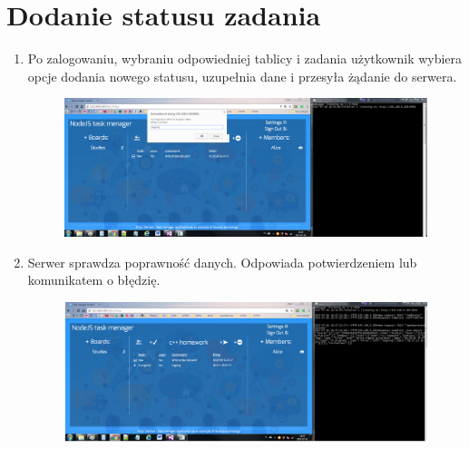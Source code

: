 \documentclass[12pt]{report}
\begin{document}
\section{Dodanie statusu zadania}
\begin{enumerate}
\item Po zalogowaniu, wybraniu odpowiedniej tablicy i zadania użytkownik wybiera opcje dodania nowego statusu, uzupełnia dane i przesyła żądanie do serwera.
\begin{figure}[!hb]
\centering
\includegraphics[width=\textwidth,height=\textheight,keepaspectratio]{B1.png}
\end{figure}
\item Serwer sprawdza poprawność danych. Odpowiada potwierdzeniem lub komunikatem o błędzię.
\begin{figure}[!hb]
\centering
\includegraphics[width=\textwidth,height=\textheight,keepaspectratio]{B2.png}
\end{figure}
\end{enumerate}
\end{document}
